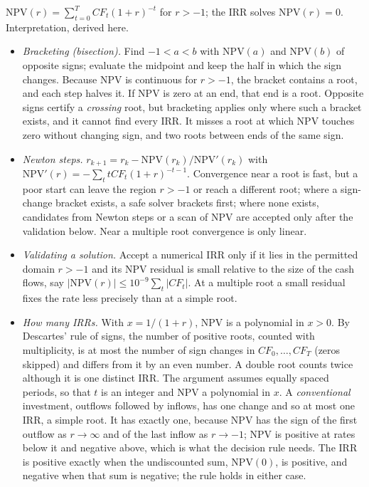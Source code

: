 \begin{qfmethod}
 $\mathrm{NPV}(r)=\sum_{t=0}^{T}CF_t(1+r)^{-t}$ for $r>-1$; the IRR solves $\mathrm{NPV}(r)=0$. Interpretation, derived here.
\begin{itemize}
\item \emph{Bracketing (bisection).} Find $-1<a<b$ with $\mathrm{NPV}(a)$ and $\mathrm{NPV}(b)$ of opposite signs; evaluate the midpoint and keep the half in which the sign changes. Because NPV is continuous for $r>-1$, the bracket contains a root, and each step halves it. If $\mathrm{NPV}$ is zero at an end, that end is a root. Opposite signs certify a \emph{crossing} root, but bracketing applies only where such a bracket exists, and it cannot find every IRR. It misses a root at which NPV touches zero without changing sign, and two roots between ends of the same sign.
\item \emph{Newton steps.} $r_{k+1}=r_k-\mathrm{NPV}(r_k)/\mathrm{NPV}'(r_k)$ with $\mathrm{NPV}'(r)=-\sum_t tCF_t(1+r)^{-t-1}$. Convergence near a root is fast, but a poor start can leave the region $r>-1$ or reach a different root; where a sign-change bracket exists, a safe solver brackets first; where none exists, candidates from Newton steps or a scan of NPV are accepted only after the validation below. Near a multiple root convergence is only linear.
\item \emph{Validating a solution.} Accept a numerical IRR only if it lies in the permitted domain $r>-1$ and its NPV residual is small relative to the size of the cash flows, say $|\mathrm{NPV}(r)|\le10^{-9}\sum_t|CF_t|$. At a multiple root a small residual fixes the rate less precisely than at a simple root.
\item \emph{How many IRRs.} With $x=1/(1+r)$, NPV is a polynomial in $x>0$. By Descartes' rule of signs, the number of positive roots, counted with multiplicity, is at most the number of sign changes in $CF_0,\dots,CF_T$ (zeros skipped) and differs from it by an even number. A double root counts twice although it is one distinct IRR. The argument assumes equally spaced periods, so that $t$ is an integer and NPV a polynomial in $x$. A \emph{conventional} investment, outflows followed by inflows, has one change and so at most one IRR, a simple root. It has exactly one, because NPV has the sign of the first outflow as $r\to\infty$ and of the last inflow as $r\to-1$; NPV is positive at rates below it and negative above, which is what the decision rule needs. The IRR is positive exactly when the undiscounted sum, $\mathrm{NPV}(0)$, is positive, and negative when that sum is negative; the rule holds in either case.
\end{itemize}


\end{qfmethod}
